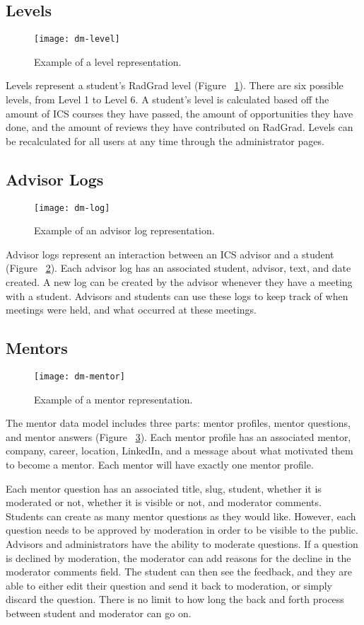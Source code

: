 \subsection{Levels}
\begin{figure}[htbp!]
\centering
\texttt{[image: dm-level]}
\caption{Example of a level representation.}
\label{levels}
\end{figure}
Levels represent a student's RadGrad level (Figure ~\ref{levels}). There are six possible levels, from Level 1 to Level 6. A student's level is calculated based off the amount of ICS courses they have passed, the amount of opportunities they have done, and the amount of reviews they have contributed on RadGrad. Levels can be recalculated for all users at any time through the administrator pages.

\subsection{Advisor Logs}
\begin{figure}[htbp!]
\centering
\texttt{[image: dm-log]}
\caption{Example of an advisor log representation.}
\label{log}
\end{figure}
Advisor logs represent an interaction between an ICS advisor and a student (Figure ~\ref{log}). Each advisor log has an associated student, advisor, text, and date created. A new log can be created by the advisor whenever they have a meeting with a student. Advisors and students can use these logs to keep track of when meetings were held, and what occurred at these meetings. 

\subsection{Mentors}
\begin{figure}[htbp!]
\centering
\texttt{[image: dm-mentor]}
\caption{Example of a mentor representation.}
\label{mentor}
\end{figure}
The mentor data model includes three parts: mentor profiles, mentor questions, and mentor answers (Figure ~\ref{mentor}). Each mentor profile has an associated mentor, company, career, location, LinkedIn, and a message about what motivated them to become a mentor. Each mentor will have exactly one mentor profile.  

Each mentor question has an associated title, slug, student, whether it is moderated or not, whether it is visible or not, and moderator comments. Students can create as many mentor questions as they would like. However, each question needs to be approved by moderation in order to be visible to the public. Advisors and administrators have the ability to moderate questions. If a question is declined by moderation, the moderator can add reasons for the decline in the moderator comments field. The student can then see the feedback, and they are able to either edit their question and send it back to moderation, or simply discard the question. There is no limit to how long the back and forth process between student and moderator can go on. 

